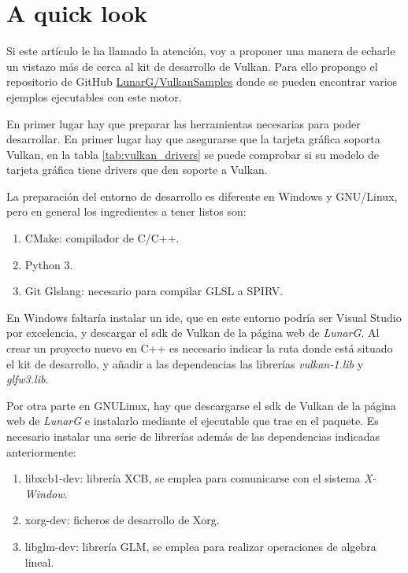 \chapter{A quick look}
Si este artículo le ha llamado la atención, voy a proponer una manera de echarle un vistazo más de cerca al kit de
desarrollo de Vulkan. Para ello propongo el repositorio de GitHub \href{https://github.com/LunarG/VulkanSamples}{LunarG/VulkanSamples}
donde se pueden encontrar varios ejemplos ejecutables con este motor.

En primer lugar hay que preparar las herramientas necesarias para poder desarrollar. En primer lugar hay que asegurarse
que la tarjeta gráfica soporta Vulkan, en la tabla \ref{tab:vulkan_drivers} se puede comprobar si su modelo de tarjeta
gráfica tiene drivers que den soporte a Vulkan.

La preparación del entorno de desarrollo es diferente en Windows y GNU/Linux, pero en general los ingredientes a
tener listos son:
\begin{enumerate}
    \item CMake: compilador de C/C++.
    \item Python 3.
    \item Git
    \iten Glslang: necesario para compilar GLSL a SPIRV.
\end{enumerate}

En Windows faltaría instalar un \gls{ide}, que en este entorno podría ser Visual Studio por excelencia, y descargar
el \gls{sdk} de Vulkan de la página web de \emph{LunarG}. Al crear un proyecto nuevo en C++ es necesario indicar la ruta
donde está situado el kit de desarrollo, y añadir a las dependencias las librerías
\emph{vulkan-1.lib} y \emph{glfw3.lib}.

Por otra parte en GNU\/Linux, hay que descargarse el \gls{sdk} de Vulkan de la página web de \emph{LunarG} e instalarlo
mediante el ejecutable que trae en el paquete. Es necesario instalar una serie de librerías además de las dependencias
indicadas anteriormente:

\begin{enumerate}
    \item libxcb1-dev: librería XCB, se emplea para comunicarse con el sistema \emph{X-Window}.
    \item xorg-dev: ficheros de desarrollo de Xorg.
    \item libglm-dev: librería GLM, se emplea para realizar operaciones de algebra lineal.
\end{enumerate}

